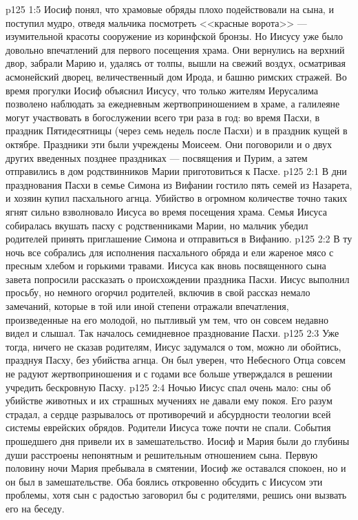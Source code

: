 \vs p125 1:5 Иосиф понял, что храмовые обряды плохо подействовали на сына, и поступил мудро, отведя мальчика посмотреть <<красные ворота>> --- изумительной красоты сооружение из коринфской бронзы. Но Иисусу уже было довольно впечатлений для первого посещения храма. Они вернулись на верхний двор, забрали Марию и, удалясь от толпы, вышли на свежий воздух, осматривая асмонейский дворец, величественный дом Ирода, и башню римских стражей. Во время прогулки Иосиф объяснил Иисусу, что только жителям Иерусалима позволено наблюдать за ежедневным жертвоприношением в храме, а галилеяне могут участвовать в богослужении всего три раза в год: во время Пасхи, в праздник Пятидесятницы (через семь недель после Пасхи) и в праздник кущей в октябре. Праздники эти были учреждены Моисеем. Они поговорили и о двух других введенных позднее праздниках --- посвящения и Пурим, а затем отправились в дом родствинников Марии приготовиться к Пасхе.
\vs p125 2:1 В дни празднования Пасхи в семье Симона из Вифании гостило пять семей из Назарета, и хозяин купил пасхального агнца. Убийство в огромном количестве точно таких ягнят сильно взволновало Иисуса во время посещения храма. Семья Иисуса собиралась вкушать пасху с родственниками Марии, но мальчик убедил родителей принять приглашение Симона и отправиться в Вифанию.
\vs p125 2:2 В ту ночь все собрались для исполнения пасхального обряда и ели жареное мясо с пресным хлебом и горькими травами. Иисуса как вновь посвященного сына завета попросили рассказать о происхождении праздника Пасхи. Иисус выполнил просьбу, но немного огорчил родителей, включив в свой рассказ немало замечаний, которые в той или иной степени отражали впечатления, произведенные на его молодой, но пытливый ум тем, что он совсем недавно видел и слышал. Так началось семидневное празднование Пасхи.
\vs p125 2:3 Уже тогда, ничего не сказав родителям, Иисус задумался о том, можно ли обойтись, празднуя Пасху, без убийства агнца. Он был уверен, что Небесного Отца совсем не радуют жертвоприношения и с годами все больше утверждался в решении учредить бескровную Пасху.
\vs p125 2:4 Ночью Иисус спал очень мало: сны об убийстве животных и их страшных мучениях не давали ему покоя. Его разум страдал, а сердце разрывалось от противоречий и абсурдности теологии всей системы еврейских обрядов. Родители Иисуса тоже почти не спали. События прошедшего дня привели их в замешательство. Иосиф и Мария были до глубины души расстроены непонятным и решительным отношением сына. Первую половину ночи Мария пребывала в смятении, Иосиф же оставался спокоен, но и он был в замешательстве. Оба боялись откровенно обсудить с Иисусом эти проблемы, хотя сын с радостью заговорил бы с родителями, решись они вызвать его на беседу.
